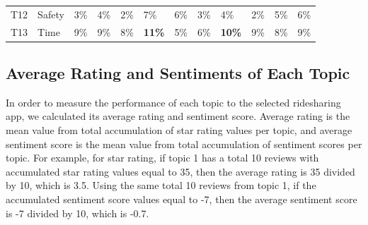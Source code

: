 \documentclass[12pt]{article}
\begin{document}
\begin{table}[!h]
\begin{tabular}{llllllllllll}
T12         & \textcolor[rgb]{0.067,0.067,0.067}{Safety}                                                                                          & 3\%           & 4\%           & 2\%                                                                   & 7\%                                                                & 6\%          & 3\%                                                                   & 4\%                                                                 & 2\%                                                                 & 5\%                                                                 & 6\%                                                                               \\
T13         & \textcolor[rgb]{0.067,0.067,0.067}{Time}                                                                                            & 9\%           & 9\%           & 8\%                                                                   & \textbf{11\%}}                                                               & 5\%          & 6\%                                                                   & \textbf{10\%}}                                                                & 9\%                                                                 & 8\%                                                                 & 9\%  \\
\end{tabular}
\hline
\label{tab:proportion}
\end{table}


\subsection{Average Rating and Sentiments of Each Topic}
In order to measure the performance of each topic to the selected ridesharing app, we calculated its average rating and sentiment score. Average rating is the mean value from total accumulation of star rating values per topic, and average sentiment score is the mean value from total accumulation of sentiment scores per topic. For example, for star rating, if topic 1 has a total 10 reviews with accumulated star rating values equal to 35, then the average rating is 35 divided by 10, which is 3.5. Using the same total 10 reviews from topic 1, if the accumulated sentiment score values equal to -7, then the average sentiment score is -7 divided by 10, which is -0.7.
\end{document}
